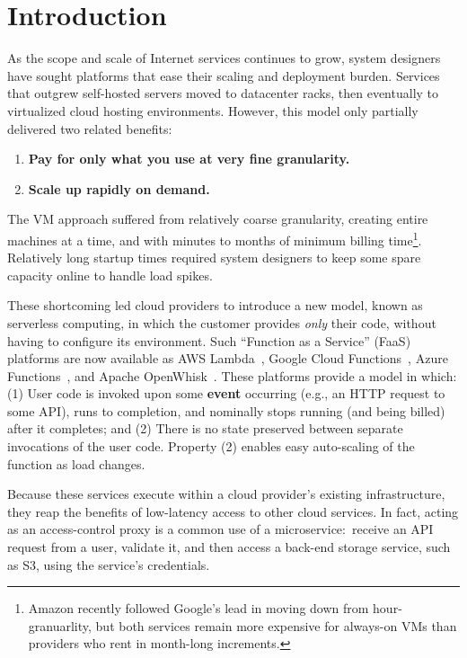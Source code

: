 \section{Introduction}
\label{sec:intro}

As the scope and scale of Internet services continues to grow, system designers
have sought platforms that ease their scaling and deployment burden.
Services that outgrew self-hosted servers moved to datacenter racks, then eventually to virtualized cloud hosting environments.
However, this model only partially delivered two related benefits:
\begin{enumerate}
\item \textbf{Pay for only what you use at very fine granularity.}
\item \textbf{Scale up rapidly on demand.}
\end{enumerate}

The VM approach suffered from relatively coarse granularity, creating entire
machines at a time, and with minutes to months of minimum billing
time\footnote{Amazon recently followed Google's lead in moving down from
  hour-granuarlity, but both services remain more expensive for always-on VMs
  than providers who rent in month-long increments.}.  Relatively long startup
times required system designers to keep some spare capacity online to handle load
spikes.

These shortcoming led cloud providers to introduce a new model, known as
serverless computing, in which the customer provides \textit{only} their code,
without having to configure its environment.   Such ``Function as a Service''
(FaaS) platforms are now available as AWS Lambda~\cite{www-amazon-lambda}, Google
Cloud Functions~\cite{www-google-cf}, Azure Functions~\cite{www-microsoft-af}, and
Apache OpenWhisk~\cite{www-apache-openwhisk}.  These platforms provide a model in
which: (1)  User code is invoked upon some \textbf{event} occurring (e.g., an HTTP
request to some API), runs to completion, and nominally stops running (and being
billed) after it completes; and (2)  There is no state preserved between
separate invocations of the user code.  Property (2) enables easy auto-scaling
of the function as load changes.

Because these services execute within a cloud provider's existing
infrastructure, they reap the benefits of low-latency access to other cloud
services.  In fact, acting as an access-control proxy is a common use of a
microservice:\ receive an API request from a user, validate it, and then access
a back-end storage service, such as S3, using the service's credentials.

